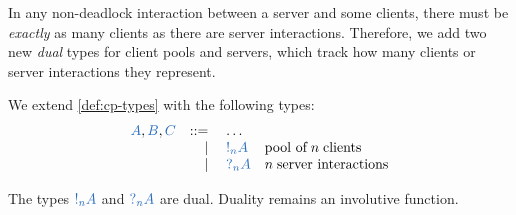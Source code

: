 \documentclass[UKenglish]{llncs}
\begin{document}
In any non-deadlock interaction between a server and some clients, 
there must be \emph{exactly} as many clients as there are server interactions.
Therefore, we add two new \emph{dual} types for client pools and servers, which
track how many clients or server interactions they represent.
\begin{definition}[Types]\label{def:nc-types}
  We extend \cref{def:cp-types} with the following types:
  \[
    \begin{array}{lrll}
      \ty{A}, \ty{B}, \ty{C}
        & ::=& \; \dots
      \\&\mid& \; \ty{\take[n]{A}} &\text{pool of} \; n \; \text{clients}
      \\&\mid& \; \ty{\give[n]{A}} &n \; \text{server interactions}
    \end{array}
  \]  
\end{definition}
The types $\ty{\take[n]{A}}$ and $\ty{\give[n]{A}}$ are dual.
Duality remains an involutive function.
\end{document}
